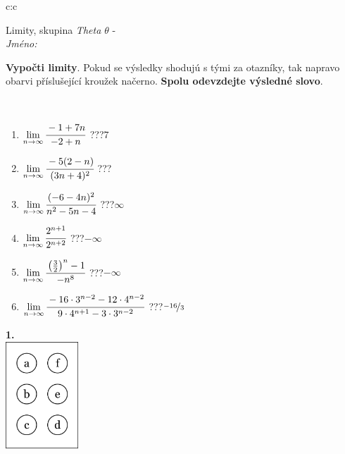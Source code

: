 \documentclass[10pt]{report}
\begin{document}
\begin{tabular}{c:c}
\begin{minipage}[c][104.5mm][t]{0.5\linewidth}
\begin{center}
\vspace{7mm}
{\huge Limity, skupina \textit{Theta $\theta$} -}\\[5mm]
\textit{Jméno:}\phantom{xxxxxxxxxxxxxxxxxxxxxxxxxxxxxxxxxxxxxxxxxxxxxxxxxxxxxxxxxxxxxxxxx}\\[5mm]
\begin{minipage}{0.95\linewidth}
\begin{center}
\textbf{Vypočti limity}. Pokud se výsledky shodujú s tými za otazníky, tak napravo\\obarvi příslušející kroužek načerno. \textbf{Spolu odevzdejte výsledné slovo}.
\end{center}
\end{minipage}
\\[1mm]
\begin{minipage}{0.79\linewidth}
\begin{center}
\begin{varwidth}{\linewidth}
\begin{enumerate}
\normalsize
\item $\lim\limits_{n\to\infty}\cfrac{-1+7n}{-2+n}$\quad \dotfill\; ???\;\dotfill \quad $7$
\item $\lim\limits_{n\to\infty}\cfrac{-5(2-n)}{(3n+4)^2}$\quad \dotfill\; ???\;\dotfill {}
\item $\lim\limits_{n\to\infty}\cfrac{(-6-4n)^2}{n^2-5n-4}$\quad \dotfill\; ???\;\dotfill \quad $\infty$
\item $\lim\limits_{n\to\infty}\cfrac{2^{n+1}}{2^{n+2}}$\quad \dotfill\; ???\;\dotfill \quad $-\infty$
\item $\lim\limits_{n\to\infty}\cfrac{\left(\frac{3}{2}\right)^n -1}{-n^{8}}$\quad \dotfill\; ???\;\dotfill \quad $-\infty$
\item $\lim\limits_{n\to\infty}\cfrac{-16\cdot 3^{n-2}-12\cdot 4^{n-2}}{9\cdot 4^{n+1}-3\cdot 3^{n-2}}$\quad \dotfill\; ???\;\dotfill \quad $\nicefrac{-16}{3}$
\end{enumerate}
\end{varwidth}
\end{center}
\end{minipage}
\begin{minipage}{0.20\linewidth}
\begin{center}
{\Huge\bfseries 1.} \\[2mm]
\includegraphics[height=40mm]{../images/braille.png}

\end{center}
\end{minipage}
\end{center}
\end{minipage}
\end{tabular}
\end{document}
